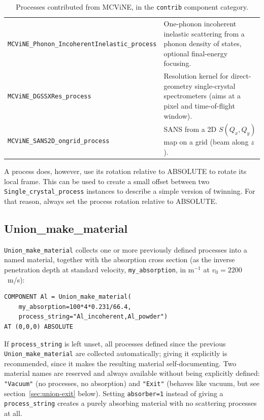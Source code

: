 \begin{table}[htb!]
\begin{center}
{\begin{tabular}{|l|p{}|}
      \texttt{MCViNE\_Phonon\_IncoherentInelastic\_process} & One-phonon incoherent inelastic scattering from a phonon density of states, optional final-energy focusing. \\
      \texttt{MCViNE\_DGSSXRes\_process} & Resolution kernel for direct-geometry single-crystal spectrometers (aims at a pixel and time-of-flight window). \\
      \texttt{MCViNE\_SANS2D\_ongrid\_process} & SANS from a 2D $S(Q_x,Q_y)$ map on a grid (beam along $z$). \\
      \hline
    \end{tabular}
    \caption{Processes contributed from MCViNE, in the \texttt{contrib} component category.}
    \label{t:union-processes-mcvine}
    }
  \end{center}
\end{table}

A process does, however, use its rotation relative to ABSOLUTE to rotate
its local frame. This can be used to create a small offset between two
\texttt{Single\_crystal\_process} instances to describe a simple version
of twinning. For that reason, always set the process rotation relative to
ABSOLUTE.


\subsection{Union\_make\_material}
\label{sec:union-materials}

\texttt{Union\_make\_material} collects one or more previously defined
processes into a named material, together with the absorption cross section
(as the inverse penetration depth at standard velocity, \texttt{my\_absorption},
in m$^{-1}$ at $v_0=2200$~m/s):
\begin{lstlisting}
COMPONENT Al = Union_make_material(
    my_absorption=100*4*0.231/66.4,
    process_string="Al_incoherent,Al_powder")
AT (0,0,0) ABSOLUTE
\end{lstlisting}
If \texttt{process\_string} is left unset, all processes defined since the
previous \texttt{Union\_make\_material} are collected automatically; giving
it explicitly is recommended, since it makes the resulting material
self-documenting. Two material names are reserved and always available
without being explicitly defined: \texttt{"Vacuum"} (no processes, no
absorption) and \texttt{"Exit"} (behaves like vacuum, but see
section~\ref{sec:union-exit} below). Setting \texttt{absorber=1} instead of
giving a \texttt{process\_string} creates a purely absorbing material with
no scattering processes at all.

